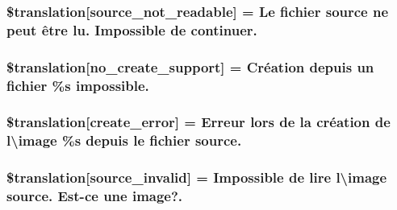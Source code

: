 \subsubsection[{\$translation}]{\setlength{\rightskip}{0pt plus 5cm}\$translation\mbox{[}\textquotesingle{}source\+\_\+not\+\_\+readable\textquotesingle{}\mbox{]} = \textquotesingle{}Le fichier source ne peut être lu. Impossible de continuer.\textquotesingle{}}\label{class_8upload_8fr___f_r_8php_a922967ca2df0efdd455261142d8e5715}
\hypertarget{class_8upload_8fr___f_r_8php_a346dfd1ade29f583dd20d345c436859f}{}
\subsubsection[{\$translation}]{\setlength{\rightskip}{0pt plus 5cm}\$translation\mbox{[}\textquotesingle{}no\+\_\+create\+\_\+support\textquotesingle{}\mbox{]} = \textquotesingle{}Création depuis un fichier \%s impossible.\textquotesingle{}}\label{class_8upload_8fr___f_r_8php_a346dfd1ade29f583dd20d345c436859f}
\hypertarget{class_8upload_8fr___f_r_8php_a53013ce9255c4e1849098ddd9fdb2b3f}{}
\subsubsection[{\$translation}]{\setlength{\rightskip}{0pt plus 5cm}\$translation\mbox{[}\textquotesingle{}create\+\_\+error\textquotesingle{}\mbox{]} = \textquotesingle{}Erreur lors de la création de l\textbackslash{}\textquotesingle{}image \%s depuis le fichier source.\textquotesingle{}}\label{class_8upload_8fr___f_r_8php_a53013ce9255c4e1849098ddd9fdb2b3f}
\hypertarget{class_8upload_8fr___f_r_8php_a6ab0a660b457eaf2d3434b225449fdd6}{}
\subsubsection[{\$translation}]{\setlength{\rightskip}{0pt plus 5cm}\$translation\mbox{[}\textquotesingle{}source\+\_\+invalid\textquotesingle{}\mbox{]} = \textquotesingle{}Impossible de lire l\textbackslash{}\textquotesingle{}image source. Est-\/ce une image?.\textquotesingle{}}\label{class_8upload_8fr___f_r_8php_a6ab0a660b457eaf2d3434b225449fdd6}
\hypertarget{class_8upload_8fr___f_r_8php_a7f3dfcc0db4bbc0f2e7210c439798e56}{}

